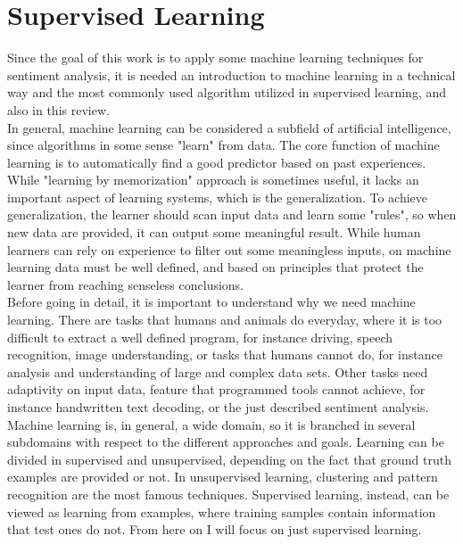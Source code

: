 \section{Supervised Learning}
Since the goal of this work is to apply some machine learning techniques for sentiment analysis, it is needed an introduction to machine learning in a technical way and the most commonly used algorithm utilized in supervised learning, and also in this review.\\
In general, machine learning can be considered a subfield of artificial intelligence, since algorithms in some sense "learn" from data. The core function of machine learning is to automatically find a good predictor based on past experiences. While "learning by memorization" approach is sometimes useful, it lacks an important aspect of learning systems, which is the generalization. To achieve generalization, the learner should scan input data and learn some "rules", so when new data are provided, it can output some meaningful result. While human learners can rely on experience to filter out some meaningless inputs, on machine learning data must be well defined, and based on principles that protect the learner from reaching senseless conclusions.\\
Before going in detail, it is important to understand why we need machine learning. There are tasks that humans and animals do everyday, where it is too difficult to extract a well defined program, for instance driving, speech recognition, image understanding, or tasks that humans cannot do, for instance analysis and understanding of large and complex data sets. Other tasks need adaptivity on input data, feature that programmed tools cannot achieve, for instance handwritten text decoding, or the just described sentiment analysis.\\
Machine learning is, in general, a wide domain, so it is branched in several subdomains with respect to the different approaches and goals. Learning can be divided in supervised and unsupervised, depending on the fact that ground truth examples are provided or not. In unsupervised learning, clustering and pattern recognition are the most famous techniques. Supervised learning, instead, can be viewed as learning from examples, where training samples contain information that test ones do not. From here on I will focus on just supervised learning.\\

